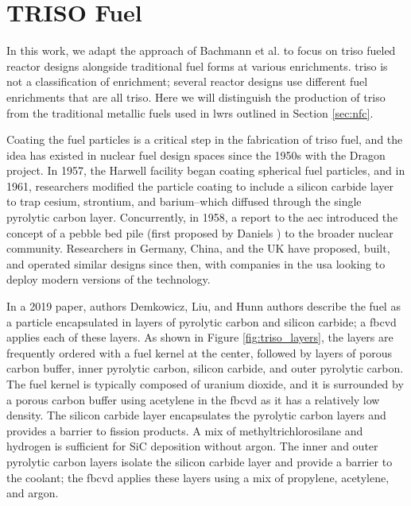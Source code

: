\section{TRISO Fuel}
\label{sec:triso_fuel}

In this work, we adapt the approach of Bachmann et al.
\cite{bachmann_enrichment_2021} to focus on \gls{triso} fueled reactor designs
alongside traditional fuel forms at various enrichments. \gls{triso} is not a
classification of enrichment; several reactor designs use different fuel
enrichments that are all \gls{triso}. Here we will distinguish the
production of \gls{triso} from the traditional metallic fuels used in
\glspl{lwr} outlined in Section \ref{sec:nfc}.

Coating the fuel particles is a critical step in the fabrication of \gls{triso}
fuel, and the idea has existed in nuclear fuel design spaces since the 1950s
\cite{price_dragon_2012} with the Dragon project. In 1957, the Harwell facility
began coating spherical fuel particles, and in 1961, researchers modified the
particle coating to include a silicon carbide layer to trap cesium, strontium,
and barium--which diffused through the single pyrolytic carbon layer.
Concurrently, in 1958, a report to the \gls{aec} introduced the concept of a
pebble bed pile (first proposed by Daniels
\cite{f_b_daniels_suggestions_1944}) to the broader nuclear community.
Researchers in Germany, China, and the UK have proposed, built, and operated
similar designs since then, with companies in the \gls{usa} looking to deploy
modern versions of the technology.

In a 2019 paper, authors Demkowicz, Liu, and Hunn \cite{particle_review_2019}
authors describe the fuel as a particle encapsulated in layers of pyrolytic
carbon and silicon carbide; a \gls{fbcvd} applies each of these layers. As
shown in Figure \ref{fig:triso_layers}, the layers are frequently ordered with
a fuel kernel at the center, followed by layers of porous carbon buffer, inner
pyrolytic carbon, silicon carbide, and outer pyrolytic carbon. The fuel kernel
is typically composed of uranium dioxide, and it is surrounded by a porous
carbon buffer using acetylene in the \gls{fbcvd} as it has a relatively low
density. The silicon carbide layer encapsulates the pyrolytic carbon layers and
provides a barrier to fission products. A mix of methyltrichlorosilane and
hydrogen is sufficient for SiC deposition without argon. The inner and outer
pyrolytic carbon layers isolate the silicon carbide layer and provide a barrier
to the coolant; the \gls{fbcvd} applies these layers using a mix of propylene,
acetylene, and argon.

